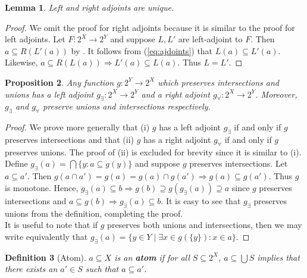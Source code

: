 \documentclass{article}
\newtheorem{proposition}{Proposition}[section]
\newtheorem{lemma}[proposition]{Lemma}
\newtheorem{definition}[proposition]{Definition}
\begin{document}
\begin{lemma}\label{lem:inv-img-adjoint-unique}
Left and right adjoints are unique.
\end{lemma}

\begin{proof}
We omit the proof for right adjoints because it is similar to the proof for left adjoints. Let $F : 2^X \to 2^Y$ and suppose $L, L'$ are left-adjoint to $F$. Then $a \subseteq R(L'(a))$ by . It follows from (\ref{eq:ajdoints}) that $L(a) \subseteq L'(a)$. Likewise, $a \subseteq R(L(a)) \Rightarrow L'(a) \subseteq L(a)$. Thus $L = L'$.
\end{proof}

\begin{proposition}\label{prop:inv-image-has-adjoints}
Any function $g : 2^Y \to 2^X$ which preserves intersections and unions has a left adjoint $g_\exists : 2^X \to 2^Y$ and a right adjoint $g_\forall : 2^X \to 2^Y$. Moreover, $g_\exists$ and $g_\forall$ preserve unions and intersections respectively.
\end{proposition}

\begin{proof}

We prove more generally that (i) $g$ has a left adjoint $g_\exists$ if and only if $g$ preserves intersections and that (ii) $g$ has a right adjoint $g_\forall$ if and only if $g$ preserves unions. The proof of (ii) is excluded for brevity since it is similar to (i). \\

Define $g_\exists(a) = \bigcap \{y : a \subseteq g(y)\}$ and suppose $g$ preserves intersections. Let $a \subseteq a'$. Then $g(a \cap a') = g(a) = g(a) \cap g(a') \Rightarrow g(a) \subseteq g(a')$. Thus $g$ is monotone. Hence, $g_\exists(a) \subseteq b \Rightarrow g(b) \supseteq g(g_\exists(a)) \supseteq a$ since $g$ preserves intersections and $a \subseteq g(b) \Rightarrow g_\exists(a) \subseteq b$. It is easy to see that $g_\exists$ preserves unions from the definition, completing the proof. \\

It is useful to note that if $g$ preserves both unions and intersections, then we may write equivalently that $g_\exists(a) = \{y \in Y \mid \exists x \in g(\{y\}) : x \in a \}$. 
\end{proof}

\begin{definition}[Atom]
$a \subseteq X$ is an \textbf{atom} if for all $S \subseteq 2^X$, $a \subseteq \bigcup S$ implies that there exists an $a' \in S$ such that $a \subseteq a'$.
\end{definition}
\end{document}
